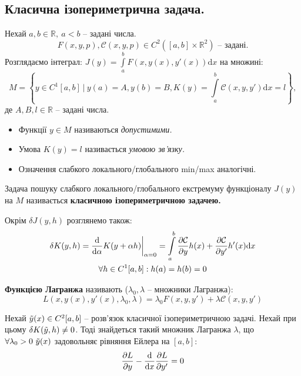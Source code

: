 \newpage

\subsection{Класична ізопериметрична задача.}
Нехай $a, b \in \mathbb{R}, \  a<b$ -- задані числа.
$$
F(x,y,p),\mathcal{C} (x,y , p) \in C^2  ([a,b] \times \mathbb{R}^2) \text{ -- задані.}
$$
Розглядаємо інтеграл:
$ \displaystyle
J(y) =  \int\limits_{a}^{ b}{ F(x, y(x), y'(x))} \mathrm{d} x
$ на множині:
$$
M = \left\lbrace
y \in C^1 [a,b]  \ \bigg| \  y(a) = A , y(b) = B, K(y) =  \int\limits_{a}^{b}{\mathcal{C} (x,y, y') \mathrm{d} x  = l }
 \right\rbrace,
$$
де $A, B, l \in \mathbb{R}$ -- задані числа.\par
\begin{itemize}
  \item Функції $y \in M$ називаються \textit{допустимими.}
  \item Умова $K(y) = l$ називається \textit{умовою зв'язку.}
  \item Означення слабкого локального/глобального min/max аналогічні.
\end{itemize}
\begin{defo}
 Задача пошуку слабкого локального/глобального екстремуму функціоналу $J(y)$ на $M$ називається \textbf{класичною ізопериметричною задачею.}
\end{defo}
Окрім $\delta J(y, h)$ розглянемо також:
$$
\begin{gathered}
\delta K(y,h ) = \frac{\mathrm{d}}{\mathrm{d} \alpha} K(y + \alpha h)\bigg|_{\alpha = 0} =  \int\limits_{a}^{b}{
\frac{\partial \mathcal{C}}{\partial y} h(x) +
\frac{\partial \mathcal{C}}{\partial y'} h'(x)  \mathrm{d} x
} \\
\forall h \in C^1[a,b] : h(a) = h(b) = 0
\end{gathered}
$$
\begin{defo} \! \textbf{Функцією Лагранжа} називають \!($\lambda_0, \lambda$ \!--\! множники Лагранжа):
  $$
  L(x, y(x) , y'(x), \lambda_0, \lambda) = \lambda_0 F(x, y, y') + \lambda\mathcal{C}(x, y, y')
  $$
\end{defo}
\begin{boxteo}
 Нехай $\tilde{y} (x) \in C^2[a,b]$ -- розв'язок класичної ізопериметричною задачі. Нехай при цьому $\delta K(\tilde{y}, h) \neq 0$. Тоді знайдеться такий множник Лагранжа $\lambda$, що $\forall \lambda_0 >0 \  \tilde{y}(x) $ задовольняє рівняння Ейлера на $[a,b]$:
 $$
 \frac{\partial L }{\partial y} - \frac{\mathrm{d}}{\mathrm{d} x} \frac{\partial L}{\partial y'} = 0
 $$
\end{boxteo}

